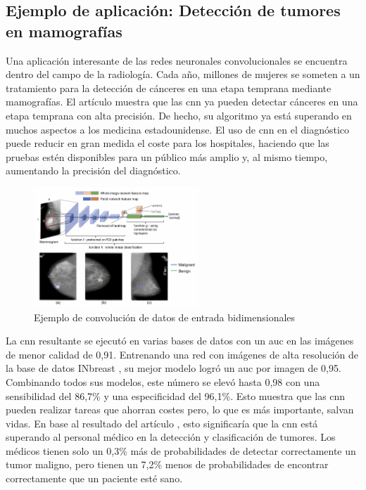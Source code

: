 \subsection*{Ejemplo de aplicación: Detección de tumores en mamografías}
\label{subsec:ejemplos-aplicacion-cnn}

Una aplicación interesante de las redes neuronales convolucionales se encuentra dentro del campo de la radiología. Cada año, millones de mujeres se someten a un tratamiento para la detección de cánceres en una etapa temprana mediante mamografías. El artículo \cite{mammography2019} muestra que las \gls{cnn} ya pueden detectar cánceres en una etapa temprana con alta precisión. De hecho, su algoritmo ya está superando en muchos aspectos a los medicina estadounidense. El uso de \gls{cnn} en el diagnóstico puede reducir en gran medida el coste para los hospitales, haciendo que las pruebas estén disponibles para un público más amplio y, al mismo tiempo, aumentando la precisión del diagnóstico.

\begin{figure}[ht]
\centering
\includegraphics[width=0.55\textwidth]{img/chapters/estado-del-arte/cnn-mamografia.png}
\caption{\label{fig:ejemplo-mamografia}Ejemplo de convolución de datos de entrada bidimensionales \cite{ankile2020deep}}
\end{figure}

La \gls{cnn} resultante se ejecutó en varias bases de datos con un \gls{auc} en las imágenes de menor calidad de 0,91. Entrenando una red con imágenes de alta resolución de la base de datos INbreast \cite{moreira2011}, su mejor modelo logró un \gls{auc} por imagen de 0,95. Combinando todos sus modelos, este número se elevó hasta 0,98 con una sensibilidad del 86,7\% y una especificidad del 96,1\%. Esto muestra que las \gls{cnn} pueden realizar tareas que ahorran costes pero, lo que es más importante, salvan vidas. En base al resultado del artículo \cite{mammography2019}, esto significaría que la \gls{cnn} está superando al personal médico en la detección y clasificación de tumores. Los médicos tienen solo un 0,3\% más de probabilidades de detectar correctamente un tumor maligno, pero tienen un 7,2\% menos de probabilidades de encontrar correctamente que un paciente esté sano.

